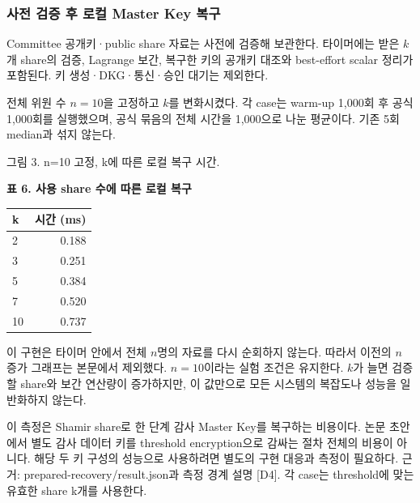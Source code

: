 \subsubsection*{사전 검증 후 로컬 Master Key 복구}
Committee 공개키·public share 자료는 사전에 검증해 보관한다.
타이머에는 받은 $k$개 share의 검증, Lagrange 보간, 복구한 키의 공개키 대조와 best-effort scalar 정리가 포함된다.
키 생성·DKG·통신·승인 대기는 제외한다.

전체 위원 수 $n=10$을 고정하고 $k$를 변화시켰다.
각 case는 warm-up 1,000회 후 공식 1,000회를 실행했으며, 공식 묶음의 전체 시간을 1,000으로 나눈 평균이다.
기존 5회 median과 섞지 않는다.
\begin{center}
    \end{center}
{\small 그림 3. n=10 고정, k에 따른 로컬 복구 시간.}\par
\begin{center}\small\setlength{\tabcolsep}{6pt}
    \textbf{표 6. 사용 share 수에 따른 로컬 복구}\par\smallskip
    \begin{tabular}{@{}lr@{}}\toprule
        \textbf{k} & \textbf{시간 (ms)} \\ \midrule
        2          & 0.188            \\
        3          & 0.251            \\
        5          & 0.384            \\
        7          & 0.520            \\
        10         & 0.737            \\
        \bottomrule\end{tabular}\end{center}

이 구현은 타이머 안에서 전체 $n$명의 자료를 다시 순회하지 않는다.
따라서 이전의 $n$ 증가 그래프는 본문에서 제외했다. $n=10$이라는 실험 조건은 유지한다.
$k$가 늘면 검증할 share와 보간 연산량이 증가하지만, 이 값만으로 모든 시스템의 복잡도나 성능을 일반화하지 않는다.

이 측정은 Shamir share로 한 단계 감사 Master Key를 복구하는 비용이다.
논문 초안에서 별도 감사 데이터 키를 threshold encryption으로 감싸는 절차 전체의 비용이 아니다.
해당 두 키 구성의 성능으로 사용하려면 별도의 구현 대응과 측정이 필요하다.
    {\small 근거: prepared-recovery/result.json과 측정 경계 설명 [D4]. 각 case는 threshold에 맞는 유효한 share k개를 사용한다.}\par

